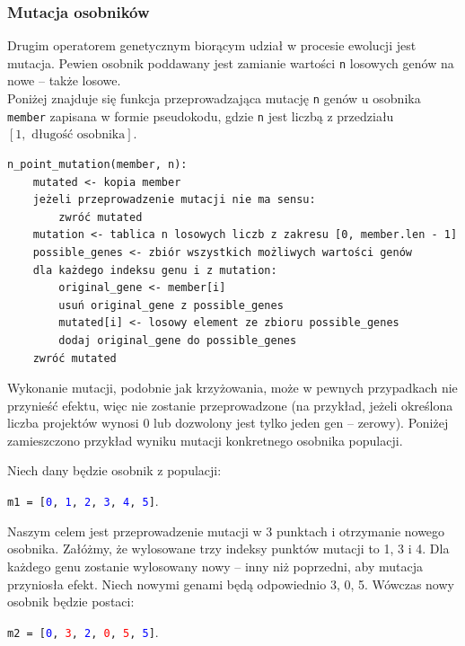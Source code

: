 \documentclass[12pt,a4paper]{article}
\theoremstyle{definition}
\begin{document}
\subsubsection{Mutacja osobników}
Drugim operatorem genetycznym biorącym udział w procesie ewolucji jest mutacja. Pewien osobnik poddawany jest zamianie wartości \texttt{n} losowych genów na nowe -- także losowe.\\

\noindent
Poniżej znajduje się funkcja przeprowadzająca mutację \texttt{n} genów u osobnika \texttt{member} zapisana w formie pseudokodu, gdzie \texttt{n} jest liczbą z przedziału $[1, \text{ długość osobnika}]$.\\

\begin{tcolorbox}[title=Krzyżowanie dwóch osobników]
\begin{verbatim}
n_point_mutation(member, n):
    mutated <- kopia member
    jeżeli przeprowadzenie mutacji nie ma sensu:
        zwróć mutated
    mutation <- tablica n losowych liczb z zakresu [0, member.len - 1]
    possible_genes <- zbiór wszystkich możliwych wartości genów
    dla każdego indeksu genu i z mutation:
        original_gene <- member[i]
        usuń original_gene z possible_genes
        mutated[i] <- losowy element ze zbioru possible_genes
        dodaj original_gene do possible_genes
    zwróć mutated
\end{verbatim}
\end{tcolorbox}

\vspace{0.5em}
\noindent
Wykonanie mutacji, podobnie jak krzyżowania, może w pewnych przypadkach nie przynieść efektu, więc nie zostanie przeprowadzone (na przykład, jeżeli określona liczba projektów wynosi 0 lub dozwolony jest tylko jeden gen -- zerowy). Poniżej zamieszczono przykład wyniku mutacji konkretnego osobnika populacji.\\

\begin{tcolorbox}[title=Przykład --- operacja mutacji]
Niech dany będzie osobnik z populacji:
\begin{center}
	\texttt{m1 = [\textcolor{blue}{0}, \textcolor{blue}{1}, \textcolor{blue}{2}, \textcolor{blue}{3}, \textcolor{blue}{4}, \textcolor{blue}{5}]}.
\end{center}
Naszym celem jest przeprowadzenie mutacji w 3 punktach i otrzymanie nowego osobnika. Załóżmy, że wylosowane trzy indeksy punktów mutacji to 1, 3 i 4. Dla każdego genu zostanie wylosowany nowy -- inny niż poprzedni, aby mutacja przyniosła efekt. Niech nowymi genami będą odpowiednio 3, 0, 5. Wówczas nowy osobnik będzie postaci:
\begin{center}
	\texttt{m2 = [\textcolor{blue}{0}, \textcolor{red}{3}, \textcolor{blue}{2}, \textcolor{red}{0}, \textcolor{red}{5}, \textcolor{blue}{5}]}.
\end{center}
\end{tcolorbox}
\end{document}
